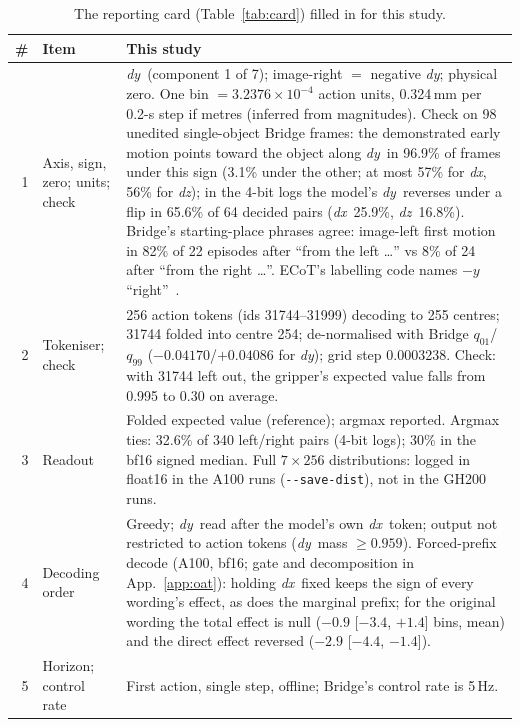 \documentclass[conference]{IEEEtran}
\newcommand{\dy}{\textit{dy}}
\newcommand{\dx}{\textit{dx}}
\newcommand{\dz}{\textit{dz}}
\begin{document}
\begin{table}[t]
\centering
\scriptsize
\setlength{\tabcolsep}{3pt}
\caption{The reporting card (Table~\ref{tab:card}) filled in for this study.}
\label{tab:cardfull}
\begin{tabular}{@{}r L{3.0cm} L{13.6cm}@{}}
\toprule
\# & Item & This study\\
 & Axis, sign, zero; units; check & \dy\ (component 1 of 7); image-right $=$ negative \dy; physical zero. One bin $=3.2376\times10^{-4}$ action units, 0.324\,mm per 0.2-s step if metres (inferred from magnitudes). Check on 98 unedited single-object Bridge frames: the demonstrated early motion points toward the object along \dy\ in 96.9\% of frames under this sign (3.1\% under the other; at most 57\% for \dx, 56\% for \dz); in the 4-bit logs the model's \dy\ reverses under a flip in 65.6\% of 64 decided pairs (\dx\ 25.9\%, \dz\ 16.8\%). Bridge's starting-place phrases agree: image-left first motion in 82\% of 22 episodes after ``from the left \dots'' vs 8\% of 24 after ``from the right \dots''. ECoT's labelling code names $-y$ ``right''~\cite{zawalski2024robotic}.\\
2 & Tokeniser; check & 256 action tokens (ids 31744--31999) decoding to 255 centres; 31744 folded into centre 254; de-normalised with Bridge $q_{01}$/$q_{99}$ ($-0.04170$/$+0.04086$ for \dy); grid step 0.0003238. Check: with 31744 left out, the gripper's expected value falls from 0.995 to 0.30 on average.\\
3 & Readout & Folded expected value (reference); argmax reported. Argmax ties: 32.6\% of 340 left/right pairs (4-bit logs); 30\% in the bf16 signed median. Full $7\times256$ distributions: logged in float16 in the A100 runs (\texttt{-{}-save-dist}), not in the GH200 runs.\\
4 & Decoding order & Greedy; \dy\ read after the model's own \dx\ token; output not restricted to action tokens (\dy\ mass ${\geq}0.959$). Forced-prefix decode (A100, bf16; gate and decomposition in App.~\ref{app:oat}): holding \dx\ fixed keeps the sign of every wording's effect, as does the marginal prefix; for the original wording the total effect is null ($-0.9$ [$-3.4$, $+1.4$] bins, mean) and the direct effect reversed ($-2.9$ [$-4.4$, $-1.4$]).\\
5 & Horizon; control rate & First action, single step, offline; Bridge's control rate is 5\,Hz.\\

\end{tabular}
\end{table}
\end{document}
